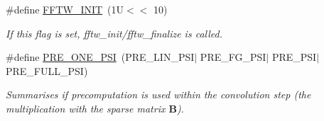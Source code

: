 \begin{CompactItemize}
\#define \hyperlink{group__nfft_gd3fe6867a3351441c6f44dd5a3746f5b}{FFTW\_\-INIT}~(1U$<$$<$ 10)
\begin{CompactList}\small\item\em If this flag is set, fftw\_\-init/fftw\_\-finalize is called. \item\end{CompactList}\item 
\#define \hyperlink{group__nfft_g44c85197c6bdcf4b632aeff5e94d5329}{PRE\_\-ONE\_\-PSI}~(PRE\_\-LIN\_\-PSI$|$ PRE\_\-FG\_\-PSI$|$ PRE\_\-PSI$|$ PRE\_\-FULL\_\-PSI)
\begin{CompactList}\small\item\em Summarises if precomputation is used within the convolution step (the multiplication with the sparse matrix $\mathbf{B}$). \item\end{CompactList}\end{CompactItemize}
